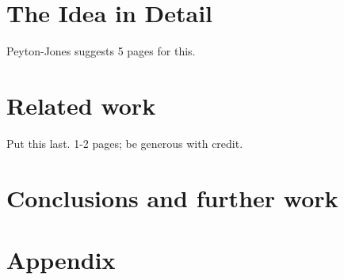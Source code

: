 \documentclass[11pt]{article}
\begin{document}
\section{The Idea in Detail}

Peyton-Jones suggests 5 pages for this.

\section{Related work}

Put this last. 1-2 pages; be generous with credit.



\section{Conclusions and further work}

\printbibliography

\newpage

\section*{Appendix}
\end{document}
